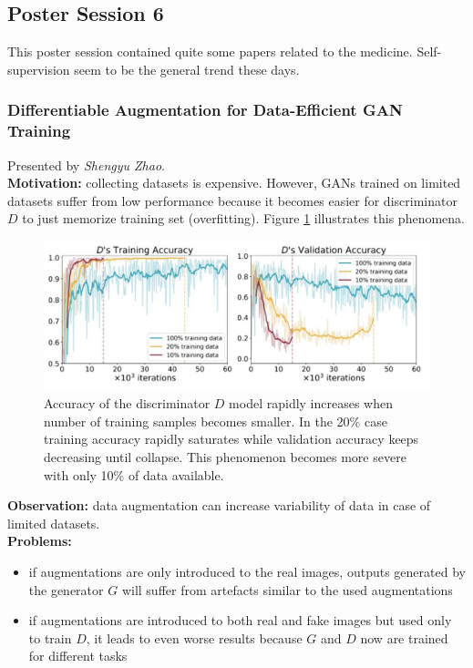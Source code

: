\subsection{Poster Session 6}

This poster session contained quite some papers related to the medicine.
Self-supervision seem to be the general trend these days.


\spacerule
\subsubsection{Differentiable Augmentation for Data-Efficient GAN Training \cite{ZhaoLLZ020}}

Presented by \textit{Shengyu Zhao}. \\

{\bf Motivation:} collecting datasets is expensive. 
However, GANs trained on limited datasets suffer from low performance because it becomes easier for discriminator $D$ to just memorize training set (overfitting). Figure \ref{fig:gan_overfitting_on_limited_data} illustrates this phenomena. \\

\begin{figure}[h!]
    \centering
    \includegraphics[scale=0.4]{neurips-2020/images/Screenshot 2020-12-11 at 10.29.55.png}
    \caption{Accuracy of the discriminator $D$ model rapidly increases when number of training samples becomes smaller. In the 20\% case training accuracy rapidly saturates while validation accuracy keeps decreasing until collapse. This phenomenon becomes more severe with only 10\% of data available.}
    \label{fig:gan_overfitting_on_limited_data}
\end{figure} 

{\bf Observation:} data augmentation can increase variability of data in case of limited datasets. \\

{\bf Problems:}
\begin{itemize}
    \item if augmentations are only introduced to the real images, outputs generated by the generator $G$ will suffer from artefacts similar to the used augmentations
    \item if augmentations are introduced to both real and fake images but used only to train $D$, it leads to even worse results because $G$ and $D$ now are trained for different tasks
\end{itemize} \\

